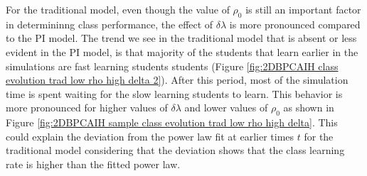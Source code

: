 For the traditional model, even though the value of $\rho_0$ is still an important factor in determininng class performance, the effect of $\delta\lambda$ is more pronounced compared to the PI model.
The trend we see in the traditional model that is absent or less evident in the PI model, is that majority of the students that learn earlier in the simulations are fast learning students students (Figure \ref{fig:2DBPCAIH class evolution trad low rho high delta 2}). 
After this period, most of the simulation time is spent waiting for the slow learning students to learn.
This behavior is more pronounced for higher values of $\delta\lambda$ and lower values of $\rho_0$ as shown in Figure \ref{fig:2DBPCAIH sample class evolution trad low rho high delta}.
This could explain the deviation from the power law fit at earlier times $t$ for the traditional model considering that the deviation shows that the class learning rate is higher than the fitted power law.

